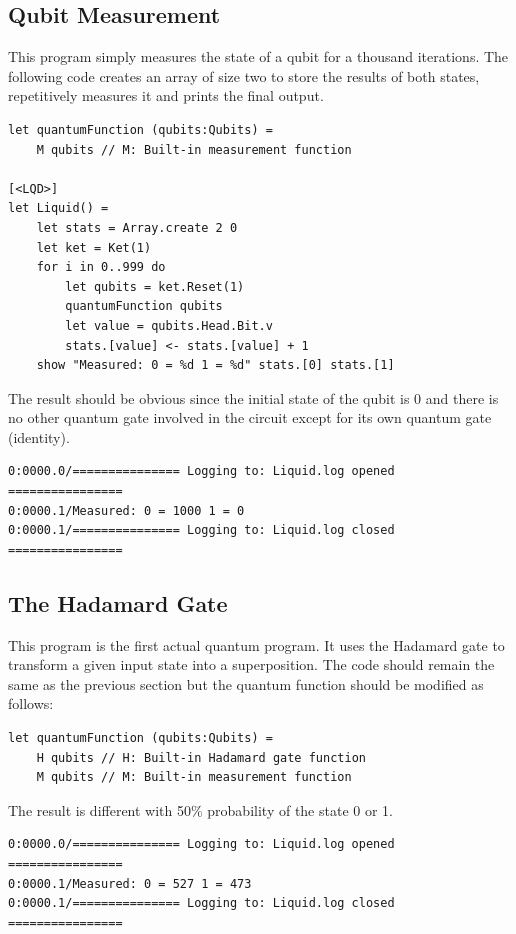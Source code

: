 \documentclass[12pt]{third-rep}
\begin{document}
\subsection{Qubit Measurement}
This program simply measures the state of a qubit for a thousand iterations. The following code creates an array of size two to store the results of both states, repetitively measures it and prints the final output.
\begin{verbatim}
let quantumFunction (qubits:Qubits) =
    M qubits // M: Built-in measurement function

[<LQD>]
let Liquid() =
    let stats = Array.create 2 0
    let ket = Ket(1)
    for i in 0..999 do
        let qubits = ket.Reset(1) 
        quantumFunction qubits
        let value = qubits.Head.Bit.v
        stats.[value] <- stats.[value] + 1
    show "Measured: 0 = %d 1 = %d" stats.[0] stats.[1]
\end{verbatim}
The result should be obvious since the initial state of the qubit is 0 and there is no other quantum gate involved in the circuit except for its own quantum gate (identity).
\begin{verbatim}
0:0000.0/=============== Logging to: Liquid.log opened ================
0:0000.1/Measured: 0 = 1000 1 = 0
0:0000.1/=============== Logging to: Liquid.log closed ================
\end{verbatim}

\newpage
\subsection{The Hadamard Gate}
This program is the first actual quantum program. It uses the Hadamard gate to transform a given input state into a superposition. The code should remain the same as the previous section but the quantum function should be modified as follows:
\begin{verbatim}
let quantumFunction (qubits:Qubits) =
    H qubits // H: Built-in Hadamard gate function
    M qubits // M: Built-in measurement function
\end{verbatim}
The result is different with 50\% probability of the state 0 or 1.
\begin{verbatim}
0:0000.0/=============== Logging to: Liquid.log opened ================
0:0000.1/Measured: 0 = 527 1 = 473
0:0000.1/=============== Logging to: Liquid.log closed ================
\end{verbatim}
\end{document}
